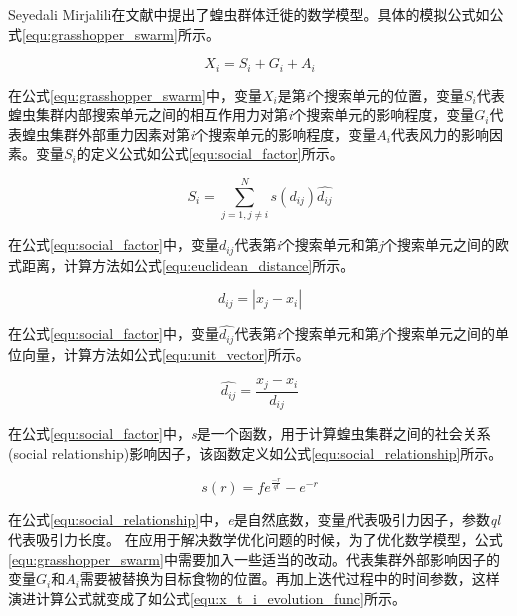 Seyedali Mirjalili在文献\cite{saremi2017grasshopper}中提出了蝗虫群体迁徙的数学模型。具体的模拟公式如公式\ref{equ:grasshopper_swarm}所示。

\begin{equation}\label{equ:grasshopper_swarm}
    X_i = S_i + G_i + A_i 
\end{equation}

在公式\ref{equ:grasshopper_swarm}中，变量$X_i$是第\emph{i}个搜索单元的位置，变量$S_i$代表蝗虫集群内部搜索单元之间的相互作用力对第\emph{i}个搜索单元的影响程度，变量$G_i$代表蝗虫集群外部重力因素对第\emph{i}个搜索单元的影响程度，变量$A_i$代表风力的影响因素。变量$S_i$的定义公式如公式\ref{equ:social_factor}所示。

\begin{equation}\label{equ:social_factor}
    S_i = \sum_{j=1, j\neq{i}}^N s(d_{ij})\widehat{d_{ij}}
\end{equation}

在公式\ref{equ:social_factor}中，变量$d_{ij}$代表第\emph{i}个搜索单元和第\emph{j}个搜索单元之间的欧式距离，计算方法如公式\ref{equ:euclidean_distance}所示。

\begin{equation}\label{equ:euclidean_distance}
    d_{ij}=|x_j-x_i|
\end{equation}

在公式\ref{equ:social_factor}中，变量$\widehat{d_{ij}}$代表第\emph{i}个搜索单元和第\emph{j}个搜索单元之间的单位向量，计算方法如公式\ref{equ:unit_vector}所示。

\begin{equation}\label{equ:unit_vector}
    \widehat{d_{ij}}=\frac{x_j-x_i}{d_{ij}}
\end{equation}

在公式\ref{equ:social_factor}中，\emph{s}是一个函数，用于计算蝗虫集群之间的社会关系(social relationship)影响因子，该函数定义如公式\ref{equ:social_relationship}所示。

\begin{equation}\label{equ:social_relationship}
    s(r) = fe^{\frac{-r}{ql}}-e^{-r}
\end{equation}

在公式\ref{equ:social_relationship}中，\emph{e}是自然底数，变量\emph{f}代表吸引力因子，参数\emph{ql}代表吸引力长度。
在应用于解决数学优化问题的时候，为了优化数学模型，公式\ref{equ:grasshopper_swarm}中需要加入一些适当的改动。代表集群外部影响因子的变量$G_i$和$A_i$需要被替换为目标食物的位置。再加上迭代过程中的时间参数，这样演进计算公式就变成了如公式\ref{equ:x_t_i_evolution_func}所示。

